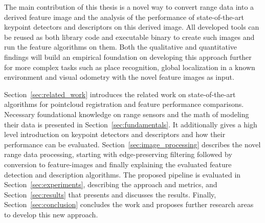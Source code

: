 The main contribution of this thesis is a novel way to convert range data into a derived feature image and the analysis of the performance of state-of-the-art keypoint detectors and descriptors on this derived image.
All developed tools can be reused as both library code and executable binary to create such images and run the feature algorithms on them.
Both the qualitative and quantitative findings will build an empirical foundation on developing this approach further for more complex tasks such as place recognition, global localization in a known environment and visual odometry with the novel feature images as input.


Section~\ref{sec:related_work} introduces the related work on state-of-the-art algorithms for pointcloud registration and feature performance comparisons.
Necessary foundational knowledge on range sensors and the math of modeling their data is presented in Section~\ref{sec:fundamentals}.
It additionally gives a high level introduction on keypoint detectors and descriptors and how their performance can be evaluated.
Section~\ref{sec:image_processing} describes the novel range data processing, starting with edge-preserving filtering followed by conversion to feature-images and finally explaining the evaluated feature detection and description algorithms.
The proposed pipeline is evaluated in Section~\ref{sec:experiments}, describing the approach and metrics, and Section~\ref{sec:results} that presents and discusses the results.
Finally, Section~\ref{sec:conclusion} concludes the work and proposes further research areas to develop this new approach.
